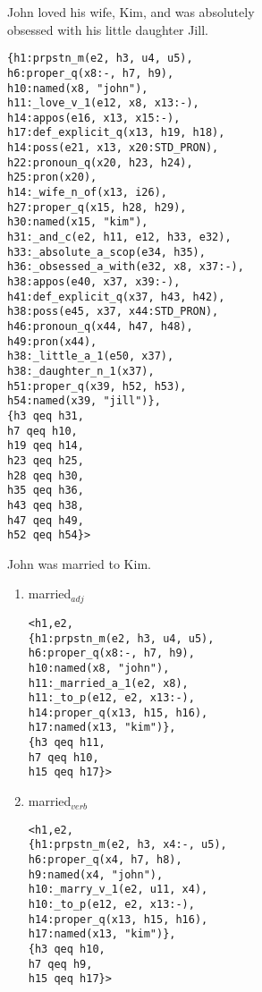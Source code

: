 \documentclass[landscape]{article}
\begin{document}
\begin{multicols}{2}
John loved his wife, Kim, and was absolutely \\
obsessed with his little daughter Jill.

\begin{verbatim}
{h1:prpstn_m(e2, h3, u4, u5), 
h6:proper_q(x8:-, h7, h9), 
h10:named(x8, "john"), 
h11:_love_v_1(e12, x8, x13:-), 
h14:appos(e16, x13, x15:-), 
h17:def_explicit_q(x13, h19, h18), 
h14:poss(e21, x13, x20:STD_PRON), 
h22:pronoun_q(x20, h23, h24), 
h25:pron(x20), 
h14:_wife_n_of(x13, i26), 
h27:proper_q(x15, h28, h29), 
h30:named(x15, "kim"), 
h31:_and_c(e2, h11, e12, h33, e32), 
h33:_absolute_a_scop(e34, h35), 
h36:_obsessed_a_with(e32, x8, x37:-), 
h38:appos(e40, x37, x39:-), 
h41:def_explicit_q(x37, h43, h42), 
h38:poss(e45, x37, x44:STD_PRON), 
h46:pronoun_q(x44, h47, h48), 
h49:pron(x44), 
h38:_little_a_1(e50, x37), 
h38:_daughter_n_1(x37), 
h51:proper_q(x39, h52, h53), 
h54:named(x39, "jill")}, 
{h3 qeq h31, 
h7 qeq h10, 
h19 qeq h14, 
h23 qeq h25, 
h28 qeq h30, 
h35 qeq h36, 
h43 qeq h38, 
h47 qeq h49, 
h52 qeq h54}> 
\end{verbatim}

\columnbreak

John was married to Kim.
\begin{enumerate}
\item married$_{adj}$
\begin{verbatim}
<h1,e2, 
{h1:prpstn_m(e2, h3, u4, u5), 
h6:proper_q(x8:-, h7, h9), 
h10:named(x8, "john"), 
h11:_married_a_1(e2, x8), 
h11:_to_p(e12, e2, x13:-), 
h14:proper_q(x13, h15, h16), 
h17:named(x13, "kim")}, 
{h3 qeq h11, 
h7 qeq h10, 
h15 qeq h17}> 
\end{verbatim}

\item married$_{verb}$
\begin{verbatim} 
<h1,e2, 
{h1:prpstn_m(e2, h3, x4:-, u5), 
h6:proper_q(x4, h7, h8), 
h9:named(x4, "john"), 
h10:_marry_v_1(e2, u11, x4), 
h10:_to_p(e12, e2, x13:-), 
h14:proper_q(x13, h15, h16), 
h17:named(x13, "kim")}, 
{h3 qeq h10, 
h7 qeq h9, 
h15 qeq h17}> 
\end{verbatim}
\end{enumerate}

\end{multicols}
\end{document}

